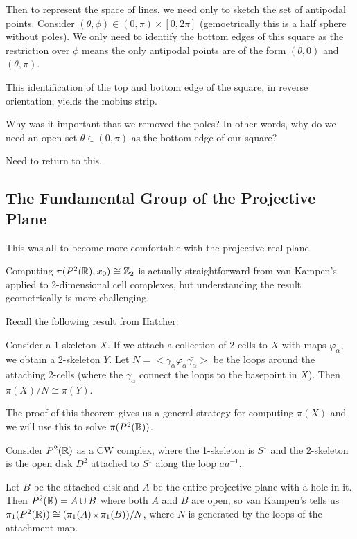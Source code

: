 \documentclass[10pt]{article}
\begin{document}
Then to represent the space of lines, we need only to sketch the set of
antipodal points. Consider $(\theta, \phi) \in (0, \pi) \times [0, 2\pi]$
(gemoetrically this is a half sphere without poles). We
only need to identify the bottom edges of this square as the restriction over
$\phi$ means the only antipodal points are of the form $(\theta, 0)$ and
$(\theta, \pi)$.

This identification of the top and bottom edge of the square, in reverse
orientation, yields the mobius strip.

Why was it important that we removed the poles? In other words, why do we need
an open set $\theta \in (0, \pi)$ as the bottom edge of our square?


Need to return to this.


\subsection{The Fundamental Group of the Projective Plane}

This was all to become more comfortable with the projective real plane 

Computing $\pi(P^2(\mathbb{R}), x_0) \cong \mathbb{Z}_2$ is actually straightforward from van
Kampen's applied to 2-dimensional cell complexes, but understanding the result
geometrically is more challenging.

Recall the following result from Hatcher:

\begin{theorem}
	Consider a 1-skeleton $X$. If we attach a collection of 2-cells to $X$ with
	maps $\varphi_{\alpha}$, we obtain a 2-skeleton $Y$. Let $N = <
\gamma_{\alpha} \varphi_{\alpha} \bar{\gamma_{\alpha}} >$ be the loops around
the attaching 2-cells (where the $\gamma_{\alpha}$ connect the loops to the
basepoint in $X$). Then $\pi(X) / N \cong \pi(Y)$.
\end{theorem}

The proof of this theorem gives us a general strategy for computing $\pi(X)$
and we will use this to solve $\pi(P^2(\mathbb{R}))$.

Consider $P^2(\mathbb{R})$ as a CW complex, where the 1-skeleton is $S^1$ and the
2-skeleton is the open disk $D^2$ attached to $S^1$ along the loop $a a^{-1}$.

Let $B$ be the attached disk and $A$ be the entire projective plane with a hole in
it. Then $P^2(\mathbb{R}) = A \cup B$ where both $A$ and $B$ are open, so van Kampen's
tells us $\pi_1(P^2(\mathbb{R})) \cong (\pi_1(A) \star \pi_1(B)) / N$, where $N$ is
generated by the loops of the attachment map.
\end{document}
